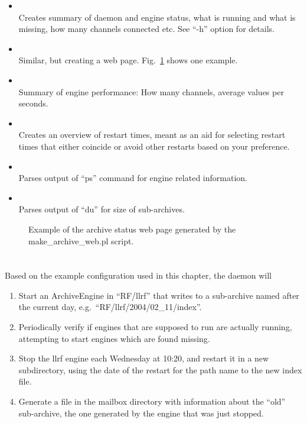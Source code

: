 \begin{itemize}
\item {} \\
      Creates summary of daemon and engine status,
      what is running and what is missing,
      how many channels connected etc.
      See ``-h'' option for details.
\item {} \\
      Similar, but creating a web page. Fig.~\ref{fig:archcfgstat}
      shows one example.
\item {} \\
      Summary of engine performance: How many channels, average values
      per seconds.
\item {} \\
      Creates an overview of restart times, meant as an aid for selecting
      restart times that either coincide or avoid other restarts based
      on your preference. 
\item {} \\
      Parses output of ``ps'' command for engine related information.
\item {} \\
      Parses output of ``du'' for size of sub-archives.
\end{itemize}

\begin{figure}[htb]
\begin{center}
\end{center}
\caption{\label{fig:archcfgstat}Example of the archive status web page
  generated by the make\_archive\_web.pl script.}
\end{figure}

\section{}
Based on the example configuration used in this chapter,
the daemon will 
\begin{enumerate}
\item Start an ArchiveEngine in ``RF/llrf'' that writes to
      a sub-archive named after the current day,
      e.g.\ ``RF/llrf/2004/02\_11/index''.
\item Periodically verify if engines that are supposed to run are
      actually running, attempting to start engines which are found missing.
\item Stop the llrf engine each Wednesday at 10:20, and restart it in
      a new subdirectory, using the date of the restart for the path
      name to the new index file.
\item Generate a file in the mailbox directory with information about
      the ``old'' sub-archive, the one generated by the engine that was
      just stopped.
\end{enumerate}

